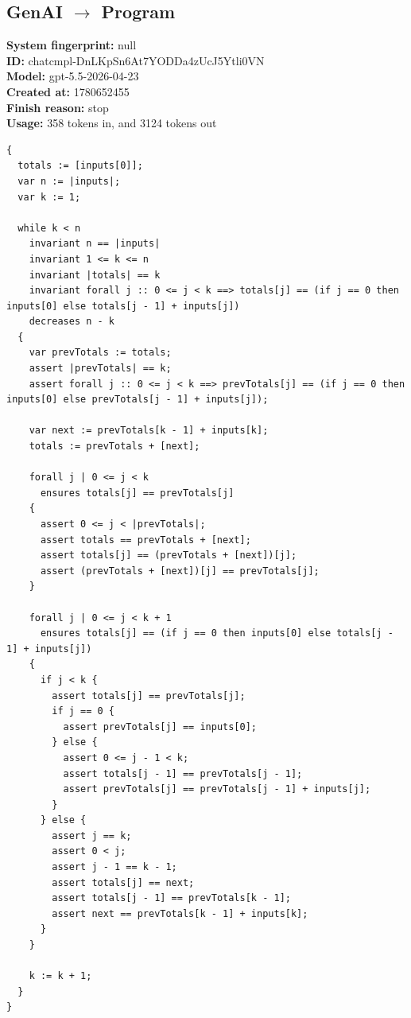 \documentclass{article}
\begin{document}
\subsection*{GenAI $\rightarrow$ Program}
\textbf{System fingerprint: }null
\\\textbf{ID: }chatcmpl-DnLKpSn6At7YODDa4zUcJ5Ytli0VN
\\\textbf{Model: }gpt-5.5-2026-04-23
\\\textbf{Created at: }1780652455
\\\textbf{Finish reason: }stop
\\\textbf{Usage: }358 tokens in, and 3124 tokens out
\begin{lstlisting}
{
  totals := [inputs[0]];
  var n := |inputs|;
  var k := 1;

  while k < n
    invariant n == |inputs|
    invariant 1 <= k <= n
    invariant |totals| == k
    invariant forall j :: 0 <= j < k ==> totals[j] == (if j == 0 then inputs[0] else totals[j - 1] + inputs[j])
    decreases n - k
  {
    var prevTotals := totals;
    assert |prevTotals| == k;
    assert forall j :: 0 <= j < k ==> prevTotals[j] == (if j == 0 then inputs[0] else prevTotals[j - 1] + inputs[j]);

    var next := prevTotals[k - 1] + inputs[k];
    totals := prevTotals + [next];

    forall j | 0 <= j < k
      ensures totals[j] == prevTotals[j]
    {
      assert 0 <= j < |prevTotals|;
      assert totals == prevTotals + [next];
      assert totals[j] == (prevTotals + [next])[j];
      assert (prevTotals + [next])[j] == prevTotals[j];
    }

    forall j | 0 <= j < k + 1
      ensures totals[j] == (if j == 0 then inputs[0] else totals[j - 1] + inputs[j])
    {
      if j < k {
        assert totals[j] == prevTotals[j];
        if j == 0 {
          assert prevTotals[j] == inputs[0];
        } else {
          assert 0 <= j - 1 < k;
          assert totals[j - 1] == prevTotals[j - 1];
          assert prevTotals[j] == prevTotals[j - 1] + inputs[j];
        }
      } else {
        assert j == k;
        assert 0 < j;
        assert j - 1 == k - 1;
        assert totals[j] == next;
        assert totals[j - 1] == prevTotals[k - 1];
        assert next == prevTotals[k - 1] + inputs[k];
      }
    }

    k := k + 1;
  }
}
\end{lstlisting}
\end{document}
